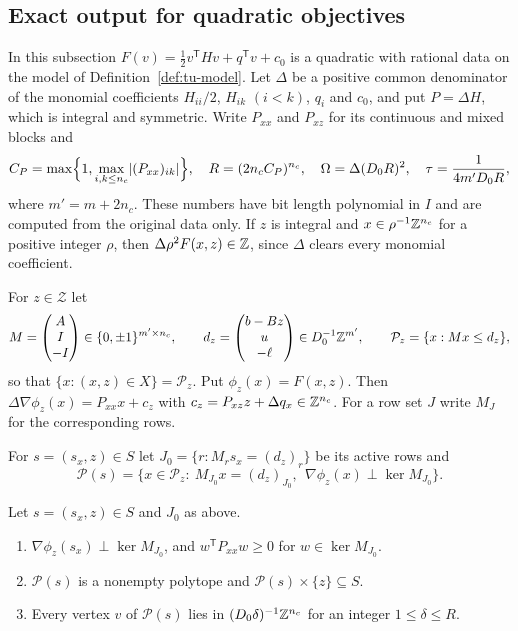 \subsection{Exact output for quadratic objectives}\label{sec:tu-exact}

In this subsection $F(v)=\frac12v^{\mathsf T}Hv+q^{\mathsf T}v+c_0$ is a quadratic with
rational data on the model of Definition~\ref{def:tu-model}. Let $\Delta$ be a
positive common denominator of the monomial coefficients $H_{ii}/2$,
$H_{ik}$ $(i<k)$, $q_i$ and $c_0$, and put $P=\Delta H$, which is integral and
symmetric. Write $P_{xx}$ and $P_{xz}$ for its continuous and mixed blocks and
\[
C_P=\max\Bigl\{1,\max_{i,k\le n_c}\lvert(P_{xx})_{ik}\rvert\Bigr\},\quad
R=(2n_cC_P)^{n_c},\quad \Omega=\Delta(D_0R)^2,\quad
\tau=\frac1{4m'D_0R},
\]
where $m'=m+2n_c$. These numbers have bit length polynomial in $I$ and are
computed from the original data only. If $z$ is integral and
$x\in\rho^{-1}\mathbb Z^{n_c}$ for a positive integer $\rho$, then
$\Delta\rho^2F(x,z)\in\mathbb Z$, since $\Delta$ clears every monomial coefficient.

For $z\in\mathcal Z$ let
\[
M=\begin{pmatrix}A\\ I\\ -I\end{pmatrix}\in\{0,\pm1\}^{m'\times n_c},\qquad
d_z=\begin{pmatrix}b-Bz\\ u\\ -\ell\end{pmatrix}\in D_0^{-1}\mathbb Z^{m'},\qquad
\mathcal P_z=\{x:Mx\le d_z\},
\]
so that $\{x:(x,z)\in X\}=\mathcal P_z$. Put $\phi_z(x)=F(x,z)$. Then
$\Delta\nabla\phi_z(x)=P_{xx}x+c_z$ with $c_z=P_{xz}z+\Delta q_x\in\mathbb Z^{n_c}$. For
a row set $J$ write $M_J$ for the corresponding rows.

\begin{definition}\label{def:tu-statpoly}
For $s=(s_x,z)\in S$ let $J_0=\{r:M_rs_x=(d_z)_r\}$ be its active rows and
\[
\mathcal P(s)=\bigl\{x\in\mathcal P_z:\ M_{J_0}x=(d_z)_{J_0},\ \
\nabla\phi_z(x)\perp\ker M_{J_0}\bigr\}.
\]
\end{definition}

\begin{lemma}[Stationary face polytopes]\label{lem:tu-statpoly}
Let $s=(s_x,z)\in S$ and $J_0$ as above.
\begin{enumerate}[label=(\alph*)]
\item $\nabla\phi_z(s_x)\perp\ker M_{J_0}$, and $w^{\mathsf T}P_{xx}w\ge0$ for
$w\in\ker M_{J_0}$.
\item $\mathcal P(s)$ is a nonempty polytope and $\mathcal P(s)\times\{z\}\subseteq S$.
\item Every vertex $v$ of $\mathcal P(s)$ lies in $(D_0\delta)^{-1}\mathbb Z^{n_c}$ for an
integer $1\le\delta\le R$.
\end{enumerate}
\end{lemma}

